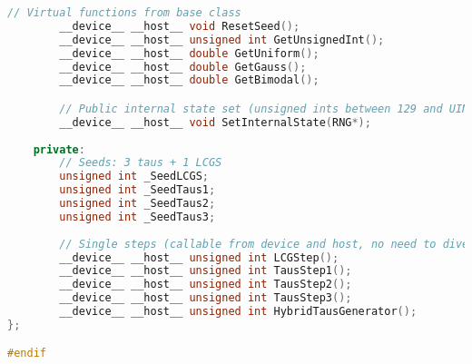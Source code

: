 \begin{lstlisting}[language=C++, caption={\texttt{libraries/CoreLibraries/RandomGenerator/RNG.cuh}}]
		// Virtual functions from base class
		__device__ __host__ void ResetSeed();
		__device__ __host__ unsigned int GetUnsignedInt();
		__device__ __host__ double GetUniform();
		__device__ __host__ double GetGauss();
		__device__ __host__ double GetBimodal();

		// Public internal state set (unsigned ints between 129 and UINT_MAX)
		__device__ __host__ void SetInternalState(RNG*);
	
	private:
		// Seeds: 3 taus + 1 LCGS
		unsigned int _SeedLCGS;
		unsigned int _SeedTaus1;
		unsigned int _SeedTaus2;
		unsigned int _SeedTaus3;
		
		// Single steps (callable from device and host, no need to diversify)
		__device__ __host__ unsigned int LCGStep();
		__device__ __host__ unsigned int TausStep1();
		__device__ __host__ unsigned int TausStep2();
		__device__ __host__ unsigned int TausStep3();
		__device__ __host__ unsigned int HybridTausGenerator();
};

#endif
\end{lstlisting}

